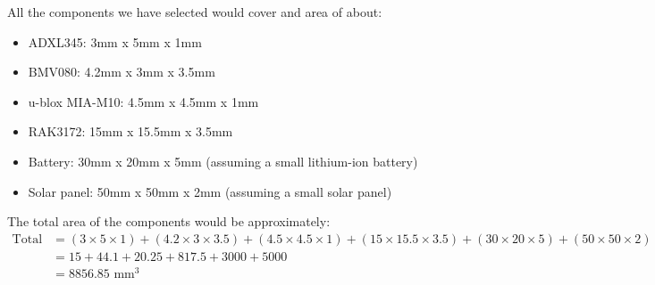 All the components we have selected would cover and area of about:

\begin{itemize}
  \item ADXL345: 3mm x 5mm x 1mm
  \item BMV080: 4.2mm x 3mm x 3.5mm
  \item u-blox MIA-M10: 4.5mm x 4.5mm x 1mm
  \item RAK3172: 15mm x 15.5mm x 3.5mm
  \item Battery: 30mm x 20mm x 5mm (assuming a small lithium-ion battery)
  \item Solar panel: 50mm x 50mm x 2mm (assuming a small solar panel)
\end{itemize}

The total area of the components would be approximately:
\begin{align*}
\text{Total area} &= (3 \times 5 \times 1) + (4.2 \times 3 \times 3.5) + (4.5 \times 4.5 \times 1) + (15 \times 15.5 \times 3.5) + (30 \times 20 \times 5) + (50 \times 50 \times 2)\\
&= 15 + 44.1 + 20.25 + 817.5 + 3000 + 5000 \\
&= 8856.85 \text{ mm}^3
\end{align*}